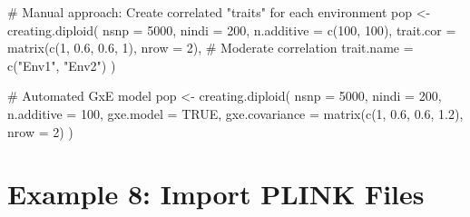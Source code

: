 \documentclass[
  letterpaper,
]{book}
\newenvironment{Shaded}{\begin{snugshade}}{\end{snugshade}}
\newcommand{\AttributeTok}[1]{\textcolor[rgb]{0.40,0.45,0.13}{#1}}
\newcommand{\CommentTok}[1]{\textcolor[rgb]{0.37,0.37,0.37}{#1}}
\newcommand{\ConstantTok}[1]{\textcolor[rgb]{0.56,0.35,0.01}{#1}}
\newcommand{\DecValTok}[1]{\textcolor[rgb]{0.68,0.00,0.00}{#1}}
\newcommand{\FloatTok}[1]{\textcolor[rgb]{0.68,0.00,0.00}{#1}}
\newcommand{\FunctionTok}[1]{\textcolor[rgb]{0.28,0.35,0.67}{#1}}
\newcommand{\NormalTok}[1]{\textcolor[rgb]{0.00,0.23,0.31}{#1}}
\newcommand{\OtherTok}[1]{\textcolor[rgb]{0.00,0.23,0.31}{#1}}
\newcommand{\SpecialCharTok}[1]{\textcolor[rgb]{0.37,0.37,0.37}{#1}}
\newcommand{\StringTok}[1]{\textcolor[rgb]{0.13,0.47,0.30}{#1}}
\begin{document}
\begin{Shaded}
\begin{Highlighting}[]
\CommentTok{\# Manual approach: Create correlated "traits" for each environment}
\NormalTok{pop }\OtherTok{\textless{}{-}} \FunctionTok{creating.diploid}\NormalTok{(}
  \AttributeTok{nsnp =} \DecValTok{5000}\NormalTok{,}
  \AttributeTok{nindi =} \DecValTok{200}\NormalTok{,}
  \AttributeTok{n.additive =} \FunctionTok{c}\NormalTok{(}\DecValTok{100}\NormalTok{, }\DecValTok{100}\NormalTok{),}
  \AttributeTok{trait.cor =} \FunctionTok{matrix}\NormalTok{(}\FunctionTok{c}\NormalTok{(}\DecValTok{1}\NormalTok{, }\FloatTok{0.6}\NormalTok{, }\FloatTok{0.6}\NormalTok{, }\DecValTok{1}\NormalTok{), }\AttributeTok{nrow =} \DecValTok{2}\NormalTok{),  }\CommentTok{\# Moderate correlation}
  \AttributeTok{trait.name =} \FunctionTok{c}\NormalTok{(}\StringTok{"Env1"}\NormalTok{, }\StringTok{"Env2"}\NormalTok{)}
\NormalTok{)}

\CommentTok{\# Automated GxE model}
\NormalTok{pop }\OtherTok{\textless{}{-}} \FunctionTok{creating.diploid}\NormalTok{(}
  \AttributeTok{nsnp =} \DecValTok{5000}\NormalTok{,}
  \AttributeTok{nindi =} \DecValTok{200}\NormalTok{,}
  \AttributeTok{n.additive =} \DecValTok{100}\NormalTok{,}
  \AttributeTok{gxe.model =} \ConstantTok{TRUE}\NormalTok{,}
  \AttributeTok{gxe.covariance =} \FunctionTok{matrix}\NormalTok{(}\FunctionTok{c}\NormalTok{(}\DecValTok{1}\NormalTok{, }\FloatTok{0.6}\NormalTok{, }\FloatTok{0.6}\NormalTok{, }\FloatTok{1.2}\NormalTok{), }\AttributeTok{nrow =} \DecValTok{2}\NormalTok{)}
\NormalTok{)}
\end{Highlighting}
\end{Shaded}

\section{Example 8: Import PLINK Files}\label{sec-example-plink}

\begin{Shaded}
\end{Shaded}
\end{document}
